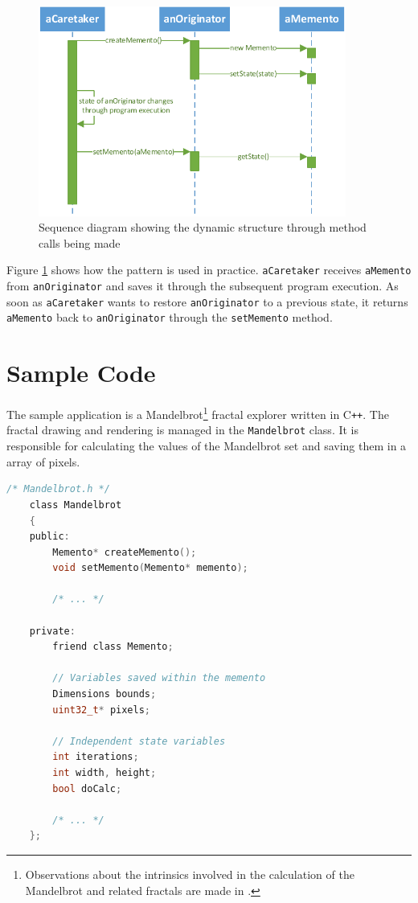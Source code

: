 \documentclass[11pt, a4paper, twoside]{article}
\def\cpp{C{}\texttt{++}}
\begin{document}
	\begin{figure}[htb]
		\begin{center}
			\includegraphics[width=0.9\textwidth]{sequence_diagram.pdf}
			\caption{Sequence diagram showing the dynamic structure through method calls being made}
			\label{fig:sequence}
		\end{center}
	\end{figure}
	
	Figure \ref{fig:sequence} shows how the pattern is used in practice. \verb|aCaretaker| receives \verb|aMemento| from \verb|anOriginator| and saves it through the subsequent program execution. As soon as \verb|aCaretaker| wants to restore \verb|anOriginator| to a previous state, it returns \verb|aMemento| back to \verb|anOriginator| through the \verb|setMemento| method.
	
	
	\section{Sample Code}
	The sample application is a Mandelbrot\footnote{Observations about the intrinsics involved in the calculation of the Mandelbrot and related fractals are made in \cite{mandelbrot1980fractal}.} fractal explorer written in \cpp. The fractal drawing and rendering is managed in the \verb|Mandelbrot| class. It is responsible for calculating the values of the Mandelbrot set and saving them in a array of pixels.
	
	\begin{lstlisting}[language=c]
	/* Mandelbrot.h */
	class Mandelbrot
	{
	public:
		Memento* createMemento();
		void setMemento(Memento* memento);
		
		/* ... */
		
	private:
		friend class Memento;
		
		// Variables saved within the memento
		Dimensions bounds;
		uint32_t* pixels;
		
		// Independent state variables
		int iterations;
		int width, height;
		bool doCalc;
		
		/* ... */
	};
	\end{lstlisting}
	
\end{document}
